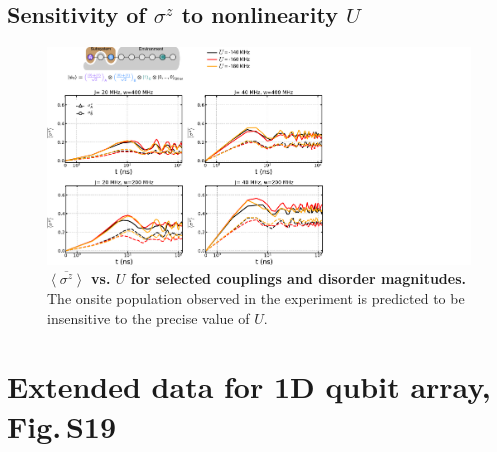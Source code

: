 \subsection{Sensitivity of $\sigma^z$ to nonlinearity $U$}
\begin{figure}[h]
\centering
\hspace*{20 mm}
\includegraphics[width=200mm, keepaspectratio]{./PDF/eta_ziiz.pdf}
\caption{\textbf{$\overline{\left< \sigma^z \right>}$ vs. $U$ for selected couplings and disorder magnitudes.}
The onsite population observed in the experiment is predicted to be insensitive to the precise value of $U$.}

\end{figure}

\section{Extended data for 1D qubit array, Fig.\,S19}
